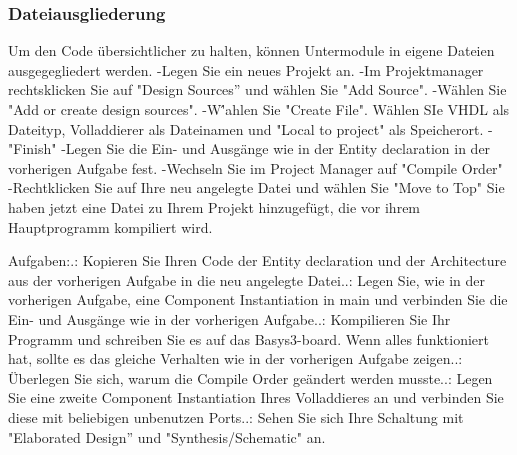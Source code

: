 \documentclass{article}
\begin{document}
\subsubsection{Dateiausgliederung}
Um den Code \"ubersichtlicher zu halten, k\"onnen Untermodule in eigene Dateien ausgegegliedert werden.\newline
-Legen Sie ein neues Projekt an.\newline
-Im Projektmanager rechtsklicken Sie auf "Design Sources'' und w\"ahlen Sie "Add Source".\newline
-W\"ahlen Sie "Add or create design sources".\newline
-W\''ahlen Sie "Create File".\newline
W\"ahlen SIe VHDL als Dateityp, Volladdierer als Dateinamen und "Local to project" als Speicherort.\newline
-"Finish"\newline
-Legen Sie die Ein- und Ausg\"ange wie in der Entity declaration in der vorherigen Aufgabe fest.\newline
-Wechseln Sie im Project Manager auf "Compile Order"\newline
-Rechtklicken Sie auf Ihre neu angelegte Datei und w\"ahlen Sie "Move to Top"\newline
Sie haben jetzt eine Datei zu Ihrem Projekt hinzugefügt, die vor ihrem Hauptprogramm kompiliert wird.\newline

Aufgaben:.: Kopieren Sie Ihren Code der Entity declaration und der Architecture aus der vorherigen Aufgabe in die neu angelegte Datei..: Legen Sie, wie in der vorherigen Aufgabe, eine Component Instantiation in main und verbinden Sie die Ein- und Ausg\"ange wie in der vorherigen Aufgabe..: Kompilieren Sie Ihr Programm und schreiben Sie es auf das Basys3-board. Wenn alles funktioniert hat, sollte es das gleiche Verhalten wie in der vorherigen Aufgabe zeigen..: \"Uberlegen Sie sich, warum die Compile Order ge\"andert werden musste..: Legen Sie eine zweite Component Instantiation Ihres Volladdieres an und verbinden Sie diese mit beliebigen unbenutzen Ports..: Sehen Sie sich Ihre Schaltung mit "Elaborated Design'' und "Synthesis/Schematic" an.
\end{document}
